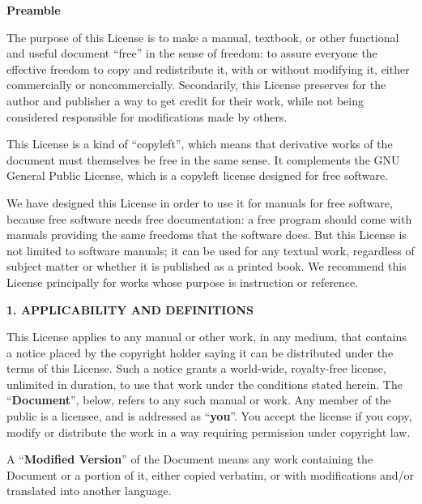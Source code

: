 \documentclass[]{report}
\theoremstyle{definition}
\theoremstyle{remark}
\theoremstyle{plain}
\numberwithin{equation}{chapter}
\begin{document}
\begin{multicols*}{2}

\begin{center}
	{\bf\footnotesize Preamble}
\end{center}


The purpose of this License is to make a manual, textbook, or other
functional and useful document ``free'' in the sense of freedom: to
assure everyone the effective freedom to copy and redistribute it,
with or without modifying it, either commercially or noncommercially.
Secondarily, this License preserves for the author and publisher a way
to get credit for their work, while not being considered responsible
for modifications made by others.

This License is a kind of ``copyleft'', which means that derivative
works of the document must themselves be free in the same sense.  It
complements the GNU General Public License, which is a copyleft
license designed for free software.

We have designed this License in order to use it for manuals for free
software, because free software needs free documentation: a free
program should come with manuals providing the same freedoms that the
software does.  But this License is not limited to software manuals;
it can be used for any textual work, regardless of subject matter or
whether it is published as a printed book.  We recommend this License
principally for works whose purpose is instruction or reference.


\begin{center}
	{\footnotesize\bf 1. APPLICABILITY AND DEFINITIONS\par}
\end{center}

This License applies to any manual or other work, in any medium, that
contains a notice placed by the copyright holder saying it can be
distributed under the terms of this License.  Such a notice grants a
world-wide, royalty-free license, unlimited in duration, to use that
work under the conditions stated herein.  The ``\textbf{Document}'', below,
refers to any such manual or work.  Any member of the public is a
licensee, and is addressed as ``\textbf{you}''.  You accept the license if you
copy, modify or distribute the work in a way requiring permission
under copyright law.

A ``\textbf{Modified Version}'' of the Document means any work containing the
Document or a portion of it, either copied verbatim, or with
modifications and/or translated into another language.


\end{multicols*}
\end{document}
